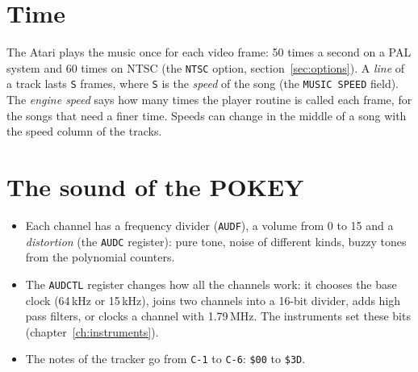 \section{Time}

The Atari plays the music once for each video frame: 50 times a second on a PAL system and 60 times on NTSC
(the \texttt{NTSC} option, section~\ref{sec:options}). A \emph{line} of a track lasts \texttt{S}
frames, where \texttt{S} is the \emph{speed} of the song (the \texttt{MUSIC SPEED} field). The
\emph{engine speed} says how many times the player routine is called each frame, for the songs that need a
finer time. Speeds can change in the middle of a song with the speed column of the tracks.

\section{The sound of the POKEY}

\begin{itemize}
  \item Each channel has a frequency divider (\texttt{AUDF}), a volume from 0 to 15 and a \emph{distortion}
        (the \texttt{AUDC} register): pure tone, noise of different kinds, buzzy tones from the polynomial counters.
  \item The \texttt{AUDCTL} register changes how all the channels work: it chooses the base clock (64\,kHz or 15\,kHz),
        joins two channels into a 16-bit divider, adds high pass filters, or clocks a channel with 1.79\,MHz.
        The instruments set these bits (chapter~\ref{ch:instruments}).
  \item The notes of the tracker go from \texttt{C-1} to \texttt{C-6}: \texttt{\$00} to \texttt{\$3D}.
\end{itemize}
